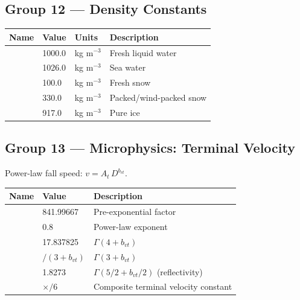 \subsection{Group 12 --- Density Constants}

\begin{longtable}{L{3.5cm} L{3cm} L{3cm} L{4.5cm}}
  \toprule
  \textbf{Name} & \textbf{Value} & \textbf{Units} & \textbf{Description} \\
  \midrule
  \endhead
  \bottomrule
  \endfoot
     & 1000.0 & kg m$^{-3}$ & Fresh liquid water \\
     & 1026.0 & kg m$^{-3}$ & Sea water \\
    & 100.0  & kg m$^{-3}$ & Fresh snow \\
   & 330.0  & kg m$^{-3}$ & Packed/wind-packed snow \\
     & 917.0  & kg m$^{-3}$ & Pure ice \\
\end{longtable}

\subsection{Group 13 --- Microphysics: Terminal Velocity}

Power-law fall speed: $v = A_t\, D^{b_{vt}}$.

\begin{longtable}{L{3cm} L{4cm} L{7cm}}
  \toprule
  \textbf{Name} & \textbf{Value} & \textbf{Description} \\
  \midrule
  \endhead
  \bottomrule
  \endfoot
    & 841.99667  & Pre-exponential factor \\
    & 0.8        & Power-law exponent \\
   & 17.837825  & $\Gamma(4+b_{vt})$ \\
   & $/(3+b_{vt})$ & $\Gamma(3+b_{vt})$ \\
   & 1.8273     & $\Gamma(5/2+b_{vt}/2)$ (reflectivity) \\
    & $\times$$/6$ & Composite terminal velocity constant \\
\end{longtable}


